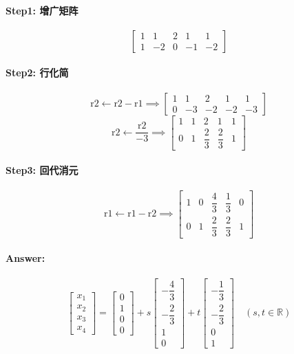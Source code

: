 \paragraph{Step1: 增广矩阵}  
\[
\left[\begin{array}{cccc|c}
1 & 1 & 2 & 1 & 1 \\
1 & -2 & 0 & -1 & -2
\end{array}\right]
\]

\paragraph{Step2: 行化简}  
\[
\text{r2} \leftarrow \text{r2} - \text{r1} \implies
\left[\begin{array}{cccc|c}
1 & 1 & 2 & 1 & 1 \\
0 & -3 & -2 & -2 & -3
\end{array}\right]
\]
\[
\text{r2} \leftarrow \dfrac{\text{r2}}{-3} \implies
\left[\begin{array}{cccc|c}
1 & 1 & 2 & 1 & 1 \\
0 & 1 & \dfrac{2}{3} & \dfrac{2}{3} & 1
\end{array}\right]
\]

\paragraph{Step3: 回代消元}  
\[
\text{r1} \leftarrow \text{r1} - \text{r2} \implies
\left[\begin{array}{cccc|c}
1 & 0 & \dfrac{4}{3} & \dfrac{1}{3} & 0 \\
0 & 1 & \dfrac{2}{3} & \dfrac{2}{3} & 1
\end{array}\right]
\]

\paragraph{Answer:}  
\[
\begin{bmatrix}
x_1 \\ x_2 \\ x_3 \\ x_4
\end{bmatrix}
=
\begin{bmatrix}
0 \\ 1 \\ 0 \\ 0
\end{bmatrix}
+
s
\begin{bmatrix}
-\dfrac{4}{3} \\ -\dfrac{2}{3} \\ 1 \\ 0
\end{bmatrix}
+
t
\begin{bmatrix}
-\dfrac{1}{3} \\ -\dfrac{2}{3} \\ 0 \\ 1
\end{bmatrix}
\quad (s, t \in \mathbb{R})
\]